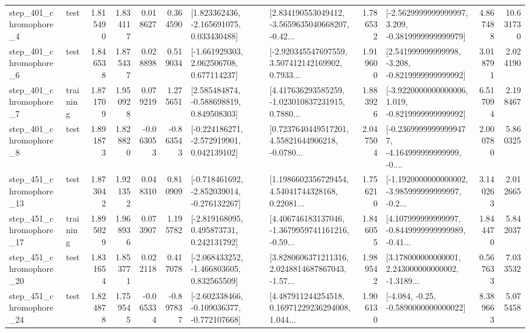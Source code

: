\begin{tabular}{llrrrrllrlrr}
   step\_401\_chromophore\_4 &      test &      1.815490 &    1.834117 &      0.018627 &  0.364590 &    [1.823362436, -2.165691075, 0.033430488] &  [2.834190553049412, -3.5659635040668207, -0.42... &       1.786532 &  [-2.5629999999999997, 3.209, -0.3819999999999979] &            4.867488 &         10.631730 \\
   step\_401\_chromophore\_6 &      test &      1.846538 &    1.875437 &      0.028898 &  0.519034 &    [-1.661929303, 2.062506708, 0.677114237] &  [-2.920345547697559, 3.507412142169902, 0.7933... &       1.919600 &   [2.541999999999998, -3.208, -0.8219999999999992] &            3.018791 &          2.024190 \\
   step\_401\_chromophore\_7 &  training &      1.871709 &    1.950928 &      0.079219 &  1.275651 &    [2.585484874, -0.588698819, 0.849508303] &  [4.417636293585259, -1.023010837231915, 0.7880... &       1.883926 &  [-3.9220000000000006, 1.019, -0.8219999999999992] &            6.517094 &          2.198467 \\
   step\_401\_chromophore\_8 &      test &      1.891873 &    1.828820 &     -0.063053 & -0.863543 &   [-0.224186271, -2.572919901, 0.042139102] &  [0.7237640449517201, 4.55821644906218, -0.0780... &       2.047504 &  [-0.23699999999999477, -4.164999999999999, -0.... &            2.000780 &          5.860325 \\
  step\_451\_chromophore\_13 &      test &      1.873042 &    1.921352 &      0.048310 &  0.810909 &  [-0.718461692, -2.852039014, -0.276132267] &  [1.1986602356729454, 4.54041744328168, 0.22081... &       1.756210 &  [-1.1920000000000002, -3.985999999999997, -0.2... &            3.140263 &          2.012665 \\
  step\_451\_chromophore\_17 &  training &      1.895029 &    1.968936 &      0.073907 &  1.195782 &    [-2.819168095, 0.495873731, 0.242131792] &  [4.406746183137046, -1.3679959741161216, -0.59... &       1.846055 &  [4.107999999999997, -0.8449999999999989, -0.41... &            1.844470 &          5.842037 \\
  step\_451\_chromophore\_20 &      test &      1.831654 &    1.853771 &      0.022118 &  0.417078 &   [-2.068433252, -1.466803605, 0.832565509] &  [3.8280606371211316, 2.0248814687867043, -1.57... &       1.989542 &  [3.178000000000001, 2.243000000000002, -1.3189... &            0.567633 &          7.033532 \\
  step\_451\_chromophore\_24 &      test &      1.824878 &    1.759545 &     -0.065334 & -0.897837 &  [-2.602338466, -0.109036377, -0.772107668] &  [4.487911244254518, 0.16971229236294008, 1.044... &       1.906130 &               [-4.084, -0.25, -0.5890000000000022] &            8.389663 &          5.075458 \\

\end{tabular}
